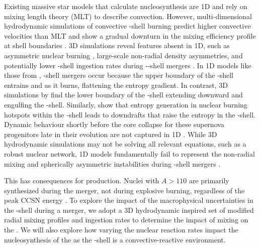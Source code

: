 Existing massive star models that calculate \pnuc{} nucleosynthesis are 1D and rely on mixing length theory (MLT) to describe convection. 
However, multi-dimensional hydrodynamic simulations of convective \oxygen[]-shell burning predict higher convective velocities than MLT and show a gradual downturn in the mixing efficiency profile at shell boundaries \citep{meakinTurbulentConvectionStellar2007,jonesIdealizedHydrodynamicSimulations2017}. 
3D simulations reveal features absent in 1D, such as asymmetric nuclear burning \citep{bazanConvectionNucleosynthesisCore1994, yadavLargescaleMixingViolent2020a}, large-scale non-radial density asymmetries, and potentially lower \carbon[]-shell ingestion rates during \oxygen[]-\neon[]-\carbon[] shell mergers \citep{andrassy3DHydrodynamicSimulations2020,yadavLargescaleMixingViolent2020a}. 
In 1D models like those from \cite{ritterNuGridStellarData2018}, \oxygen[]-\carbon[] shell mergers occur because the upper boundary of the \oxygen[]-shell entrains \carbon[12] and \neon[20] as it burns, flattening the entropy gradient. 
In contrast, 3D simulations by \cite{rizzutiShellMergersLate2024a} find the lower boundary of the \carbon[]-shell extending downward and engulfing the \oxygen[]-shell. 
Similarly, \cite{yadavLargescaleMixingViolent2020a} show that entropy generation in nuclear burning hotspots within the \neon[]-shell leads to downdrafts that raise the entropy in the \oxygen[]-shell. 
Dynamic behaviour shortly before the core collapse for these supernova progenitors late in their evolution are not captured in 1D \citep{arnettRealisticProgenitorsCorecollapse2011, mullerStatusMultiDimensionalCoreCollapse2016, yadavLargescaleMixingViolent2020a}. 
While 3D hydrodynamic simulations may not be solving all relevant equations, such as a robust nuclear network, 1D models fundamentally fail to represent the non-radial mixing and spherically asymmetric instabilities during \oxygen[]-\carbon[] shell mergers \citep{meakinActiveCarbonOxygen2006,andrassy3DHydrodynamicSimulations2020, yadavLargescaleMixingViolent2020a}. 

This has consequences for \pnuc{} production. Nuclei with $A > 110$ are primarily synthesized during the merger, not during explosive burning, regardless of the peak CCSN energy \citep{robertiGprocessNucleosynthesisCorecollapse2023,robertiGprocessNucleosynthesisCorecollapse2024b}. 
To explore the impact of the macrophysical uncertainties in the \oxygen[]-shell during a merger, we adopt a 3D hydrodynamic inspired set of modified radial mixing profiles and ingestion rates to determine the impact of mixing on the \gprn.
We will also explore how varying the nuclear reaction rates impact the nucleosynthesis of the \pnucn{} as the \oxygen[]-shell is a convective-reactive environment.

